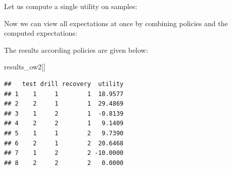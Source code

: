 \documentclass[
]{article}
\newenvironment{Shaded}{\begin{snugshade}}{\end{snugshade}}
\newcommand{\AttributeTok}[1]{\textcolor[rgb]{0.77,0.63,0.00}{#1}}
\newcommand{\ControlFlowTok}[1]{\textcolor[rgb]{0.13,0.29,0.53}{\textbf{#1}}}
\newcommand{\DecValTok}[1]{\textcolor[rgb]{0.00,0.00,0.81}{#1}}
\newcommand{\FunctionTok}[1]{\textcolor[rgb]{0.00,0.00,0.00}{#1}}
\newcommand{\NormalTok}[1]{#1}
\newcommand{\OtherTok}[1]{\textcolor[rgb]{0.56,0.35,0.01}{#1}}
\newcommand{\SpecialCharTok}[1]{\textcolor[rgb]{0.00,0.00,0.00}{#1}}
\newcommand{\StringTok}[1]{\textcolor[rgb]{0.31,0.60,0.02}{#1}}
\begin{document}
Let us compute a single utility on samples:

\begin{Shaded}
\end{Shaded}

Now we can view all expectations at once by combining policies and the computed expectations:

\begin{Shaded}
\end{Shaded}

The results according policies are given below:

\begin{Shaded}
\begin{Highlighting}[]
\NormalTok{results\_ow2[]}
\end{Highlighting}
\end{Shaded}

\begin{verbatim}
##   test drill recovery  utility
## 1    1     1        1  18.9577
## 2    2     1        1  29.4869
## 3    1     2        1  -0.8139
## 4    2     2        1   9.1409
## 5    1     1        2   9.7390
## 6    2     1        2  20.6468
## 7    1     2        2 -10.0000
## 8    2     2        2   0.0000
\end{verbatim}
\end{document}
